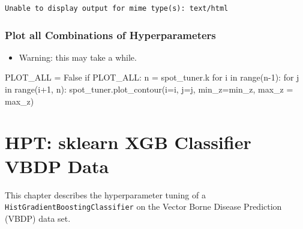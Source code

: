 \documentclass[
  letterpaper,
  DIV=11,
  numbers=noendperiod]{scrreprt}
\newenvironment{Shaded}{\begin{snugshade}}{\end{snugshade}}
\newcommand{\BuiltInTok}[1]{\textcolor[rgb]{0.00,0.23,0.31}{#1}}
\newcommand{\ControlFlowTok}[1]{\textcolor[rgb]{0.00,0.23,0.31}{#1}}
\newcommand{\DecValTok}[1]{\textcolor[rgb]{0.68,0.00,0.00}{#1}}
\newcommand{\KeywordTok}[1]{\textcolor[rgb]{0.00,0.23,0.31}{#1}}
\newcommand{\NormalTok}[1]{\textcolor[rgb]{0.00,0.23,0.31}{#1}}
\newcommand{\OperatorTok}[1]{\textcolor[rgb]{0.37,0.37,0.37}{#1}}
\newcommand{\VariableTok}[1]{\textcolor[rgb]{0.07,0.07,0.07}{#1}}
\providecommand{\tightlist}{%
  \setlength{\itemsep}{0pt}\setlength{\parskip}{0pt}}\usepackage{longtable,booktabs,array}
\begin{document}
\begin{verbatim}
Unable to display output for mime type(s): text/html
\end{verbatim}

\hypertarget{plot-all-combinations-of-hyperparameters-2}{%
\subsection{Plot all Combinations of
Hyperparameters}\label{plot-all-combinations-of-hyperparameters-2}}

\begin{itemize}
\tightlist
\item
  Warning: this may take a while.
\end{itemize}

\begin{Shaded}
\begin{Highlighting}[]
\NormalTok{PLOT\_ALL }\OperatorTok{=} \VariableTok{False}
\ControlFlowTok{if}\NormalTok{ PLOT\_ALL:}
\NormalTok{    n }\OperatorTok{=}\NormalTok{ spot\_tuner.k}
    \ControlFlowTok{for}\NormalTok{ i }\KeywordTok{in} \BuiltInTok{range}\NormalTok{(n}\OperatorTok{{-}}\DecValTok{1}\NormalTok{):}
        \ControlFlowTok{for}\NormalTok{ j }\KeywordTok{in} \BuiltInTok{range}\NormalTok{(i}\OperatorTok{+}\DecValTok{1}\NormalTok{, n):}
\NormalTok{            spot\_tuner.plot\_contour(i}\OperatorTok{=}\NormalTok{i, j}\OperatorTok{=}\NormalTok{j, min\_z}\OperatorTok{=}\NormalTok{min\_z, max\_z }\OperatorTok{=}\NormalTok{ max\_z)}
\end{Highlighting}
\end{Shaded}

\hypertarget{sec-hpt-sklearn-xgb-classifier-vbdp-data}{%
\chapter{HPT: sklearn XGB Classifier VBDP
Data}\label{sec-hpt-sklearn-xgb-classifier-vbdp-data}}

This chapter describes the hyperparameter tuning of a
\texttt{HistGradientBoostingClassifier} on the Vector Borne Disease
Prediction (VBDP) data set.
\end{document}
